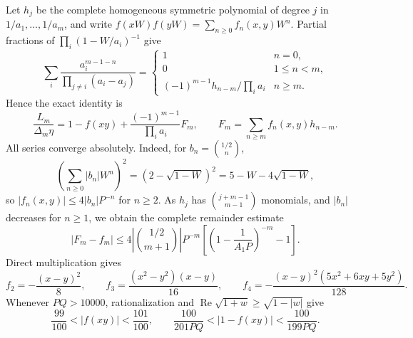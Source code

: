 \documentclass[12pt]{article}
\numberwithin{equation}{section}
\begin{document}
Let \(h_j\) be the complete homogeneous symmetric polynomial of degree
\(j\) in \(1/a_1,\ldots,1/a_m\), and write
\(f(xW)f(yW)=\sum_{n\ge0}f_n(x,y)W^n\).
Partial fractions of \(\prod_i(1-W/a_i)^{-1}\) give
\[
 \sum_i\frac{a_i^{m-1-n}}{\prod_{j\ne i}(a_i-a_j)}
 =\begin{cases}
 1&n=0,\\
 0&1\le n<m,\\
 (-1)^{m-1}h_{n-m}/\prod_i a_i&n\ge m.
 \end{cases}
\]
Hence the exact identity is
\begin{equation}\label{eq:coherent-exact}
 \frac{L_m}{\Delta_m\eta}
 =1-f(xy)+\frac{(-1)^{m-1}}{\prod_i a_i}F_m,\qquad
 F_m=\sum_{n\ge m}f_n(x,y)h_{n-m}.
\end{equation}
All series converge absolutely. Indeed, for \(b_n=\binom{1/2}{n}\),
\[
 \left(\sum_{n\ge0}|b_n|W^n\right)^2
 =(2-\sqrt{1-W})^2=5-W-4\sqrt{1-W},
\]
so \(|f_n(x,y)|\le4|b_n|P^{-n}\) for \(n\ge2\).
As \(h_j\) has \(\binom{j+m-1}{m-1}\) monomials, and \(|b_n|\)
decreases for \(n\ge1\), we obtain the complete remainder estimate
\begin{equation}\label{eq:coherent-tail}
 |F_m-f_m|\le
 4\left|\binom{1/2}{m+1}\right|P^{-m}
 \left[\left(1-\frac1{A_1P}\right)^{-m}-1\right].
\end{equation}
Direct multiplication gives
\begin{equation}\label{eq:integrated-5}
f_2=-\frac{(x-y)^2}{8},\qquad
 f_3=\frac{(x^2-y^2)(x-y)}{16},\qquad
 f_4=-\frac{(x-y)^2(5x^2+6xy+5y^2)}{128}.
\end{equation}
Whenever \(PQ>10000\), rationalization and
\(\operatorname{Re}\sqrt{1+w}\ge\sqrt{1-|w|}\) give
\begin{equation}\label{eq:coherent-near-one}
 \frac{99}{100}<|f(xy)|<\frac{101}{100},\qquad
 \frac{100}{201PQ}<|1-f(xy)|<\frac{100}{199PQ}.
\end{equation}
\end{document}
